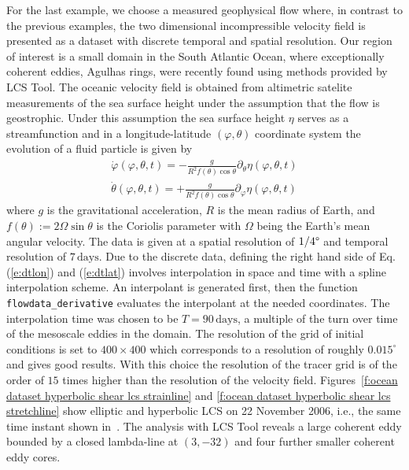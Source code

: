 \documentclass{article}
\begin{document}
For the last example, we choose a measured geophysical flow where, in contrast to the previous examples, the two dimensional incompressible velocity field is presented as a dataset with discrete temporal and spatial resolution. Our region of interest is a small domain in the South Atlantic Ocean, where exceptionally coherent eddies, Agulhas rings, were recently found using methods provided by LCS Tool\parencite{haller13:_coher_lagran}. The oceanic velocity field is obtained from altimetric satelite measurements of the sea surface height under the assumption that the flow is geostrophic. Under this assumption the sea surface height $\eta$ serves as a streamfunction and in a longitude-latitude $(\varphi,\theta)$ coordinate system the evolution of a fluid particle is given by
\begin{eqnarray}
\dot{\varphi}(\varphi,\theta,t) = -\frac{g}{R^2 f(\theta) \cos\theta}\partial_{\theta}\eta(\varphi,\theta,t)\label{e:dtlon}\\
\dot{\theta}(\varphi,\theta,t) = +\frac{g}{R^2 f(\theta) \cos\theta}\partial_{\varphi}\eta(\varphi,\theta,t)
\label{e:dtlat}
\end{eqnarray}
where $g$ is the gravitational acceleration, $R$ is the mean radius of Earth, and $f(\theta):=2\Omega\sin\theta$ is the Coriolis parameter with $\Omega$ being the Earth's mean angular velocity. The data is given at a spatial resolution of $1/4\degree$ and temporal resolution of $7\,\mathrm{days}$. Due to the discrete data, defining the right hand side of Eq.\,(\ref{e:dtlon}) and (\ref{e:dtlat}) involves interpolation in space and time with a spline interpolation scheme. An interpolant is generated first, then the function \texttt{flowdata\_derivative} evaluates the interpolant at the needed coordinates. The interpolation time was chosen to be $T=90\,\mathrm{days}$, a multiple of the turn over time of the mesoscale eddies in the domain. The resolution of the grid of initial conditions is set to $400\times400$ which corresponds to a resolution of roughly $0.015^\circ$ and gives good results. With this choice the resolution of the tracer grid is of the order of $15$ times higher than the resolution of the velocity field.
Figures~\ref{f:ocean dataset hyperbolic shear lcs strainline} and \ref{f:ocean dataset hyperbolic shear lcs stretchline} show elliptic and hyperbolic LCS on 22 November 2006, i.e., the same time instant shown in~\textcite{haller13:_coher_lagran,beron-vera13:_objec_agulh}. The analysis with LCS Tool reveals a large coherent eddy bounded by a closed lambda-line at $(3,-32)$ and four further smaller coherent eddy cores. 
\end{document}
